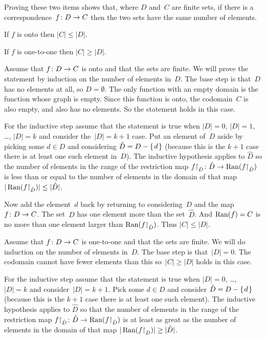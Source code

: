 \documentclass{ibl}  %
\begin{document}
\begin{ex}   \label{CorrespondingSetsHaveSameNumberOfElements}
  Proving these two items shows that, 
  where $D$ and~$C$ are finite sets, 
  if there is a correspondence~$\mbox{$f\colon D\to C$}$
  then the two sets have the same number of elements.
\begin{exes}
\item If $f$ is onto then $|C|\leq |D|$.
\item If $f$ is one-to-one then $|C|\geq |D|$.
\end{exes}
\begin{ans}
\begin{exes}
\item Assume that $\mbox{$f\colon D\to C$}$ is onto and
  that the sets are finite.
  We will prove the statement by induction on the number of elements in~$D$.
  The base step is that~$D$ has no elements at all, so $D=\emptyset$.
  The only function with an empty domain is the function whose graph is 
  empty. 
  Since this function is onto, the codomain~$C$ is also empty, 
  and also has no elements.
  So the statement holds in this case.

  For the inductive step assume that the statement is true when $|D|=0$, 
  $|D|=1$, \ldots, $|D|=k$ and consider the~$|D|=k+1$ case.
  Put an element of~$D$ aside by picking some $d\in D$ and considering 
  $\hat{D}=D-\mbox{$\{\hspace{0.1em}d\hspace{0.1em}\}$}$ (because this is the $k+1$ case there is at least
  one such element in~$D$).
  The inductive hypothesis applies to $\hat{D}$ so the number of elements in
  the range of the restriction map 
  $\mbox{${f}\mathord\upharpoonright_{\hat{D}}\colon \hat{D}\to \operatorname{Ran}({f}\mathord\upharpoonright_{\hat{D}})$}$
  is less than or equal to the number of elements in the domain of that map
  $|\operatorname{Ran}({f}\mathord\upharpoonright_{\hat{D}})|\leq |\hat{D}|$.

  Now add the element~$d$ back by returning to considering~$D$ and the 
  map~$\mbox{$f\colon D\to C$}$.
  The set~$D$ has one element more than the set~$\hat{D}$.
  And $\operatorname{Ran}(f)=C$ is no more than one element larger than
  $\operatorname{Ran}({f}\mathord\upharpoonright_{\hat{D}})$.
  Thus $|C|\leq|D|$.
\item Assume that $\mbox{$f\colon D\to C$}$ is one-to-one and
  that the sets are finite.
  We will do induction on the number of elements in~$D$.
  The base step is that~$|D|=0$.
  The codomain cannot have fewer elements than this
  so~$|C|\geq |D|$ holds in this case.

  For the inductive step assume that the statement is true when $|D|=0$, 
  \ldots, $|D|=k$ and consider~$|D|=k+1$.
  Pick some $d\in D$ and consider 
  $\hat{D}=D-\mbox{$\{\hspace{0.1em}d\hspace{0.1em}\}$}$ (because this is the $k+1$ case there is at least
  one such element).
  The inductive hypothesis applies to $\hat{D}$ so that 
  the number of elements in the range of the restriction map 
  $\mbox{${f}\mathord\upharpoonright_{\hat{D}}\colon \hat{D}\to \operatorname{Ran}({f}\mathord\upharpoonright_{\hat{D}})$}$
  is at least as great as the number of elements in the domain of that map
  $|\operatorname{Ran}({f}\mathord\upharpoonright_{\hat{D}})|\geq |\hat{D}|$.


\end{exes}
\end{ans}
\end{ex}
\end{document}
